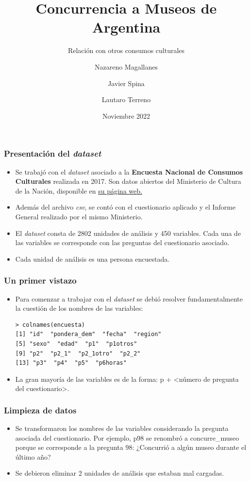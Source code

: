 \documentclass{beamer}
\title{Concurrencia a Museos de Argentina}
\subtitle{Relación con otros consumos culturales}
\author{Nazareno Magallanes \and Javier Spina \and Lautaro Terreno}
\institute[ECyT]
{
  Escuela de Ciencia y Tecnología
  \and
  Universidad Nacional de San Martín
}
\date{Noviembre 2022}
\begin{document}
\frame{\titlepage}

\begin{frame}
\frametitle{Presentación del \textit{dataset}}

\begin{itemize}
\item<1-> Se trabajó con el \textit{dataset} asociado a la \textbf{Encuesta Nacional de Consumos Culturales} realizada en 2017. Son datos abiertos del Ministerio de Cultura de la Nación, disponible en \href{https://datos.cultura.gob.ar/dataset/encuesta-nacional-de-consumos-culturales-2017}{su página web.}
\item<2-> Además del archivo \textit{csv}, se contó con el cuestionario aplicado y el Informe General realizado por el mismo Ministerio.
\item<3->El \textit{dataset} consta de 2802 unidades de análisis y 450 variables. Cada una de las variables se corresponde con las preguntas del cuestionario asociado.
\item <4->Cada unidad de análisis es una persona encuestada.
\end{itemize}

\end{frame}

\begin{frame}[fragile]
\frametitle{Un primer vistazo}

\begin{itemize}
\item<1->Para comenzar a trabajar con el \textit{dataset} se debió resolver fundamentalmente la cuestión de los nombres de las variables: 

\begin{lstlisting}
> colnames(encuesta)
[1] "id"  "pondera_dem"  "fecha"  "region"
[5] "sexo"  "edad"  "p1"  "p1otros"
[9] "p2"  "p2_1"  "p2_1otro"  "p2_2"
[13] "p3"  "p4"  "p5"  "p6horas"
\end{lstlisting}

\item<2->La gran mayoría de las variables es de la forma: p + <número de pregunta del cuestionario>.
\end{itemize}

\end{frame}

\begin{frame}
\frametitle{Limpieza de datos}

\begin{itemize}
\item<1-> Se transformaron los nombres de las variables considerando la pregunta asociada del cuestionario. Por ejemplo, p98 se renombró a concurre\_museo porque se corresponde a la pregunta 98: ¿Concurrió a algún museo durante el último año?
\item<2-> Se debieron eliminar 2 unidades de análisis que estaban mal cargadas.
\end{itemize}

\end{frame}
\end{document}
